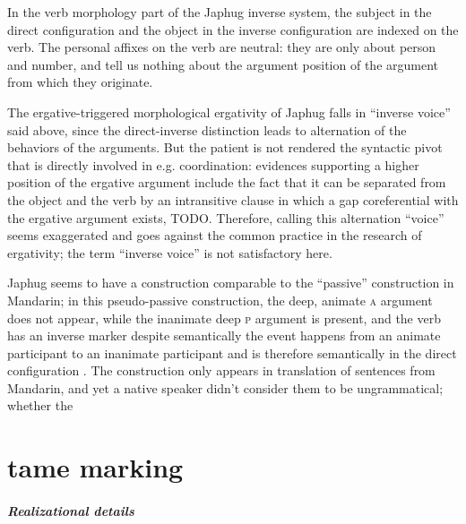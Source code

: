 \documentclass[a4paper, oneside, 12pt]{report}
\newcommand*{\citepage}[1]{p.~{#1}}
\newcommand{\category}[1]{\textsc{#1}}
\begin{document}
In the verb morphology part of the Japhug inverse system, 
the subject in the direct configuration
and the object in the inverse configuration 
are indexed on the verb. 
The personal affixes on the verb are neutral: 
they are only about person and number, 
and tell us nothing about the argument position of the argument 
from which they originate.

The ergative-triggered morphological ergativity of Japhug
falls in ``inverse voice'' said above, 
since the direct-inverse distinction leads to 
alternation of the behaviors of the arguments.
But the patient is not rendered the syntactic pivot 
that is directly involved in e.g. coordination:
evidences supporting a higher position of the ergative argument 
include the fact that it can be separated from the object and the verb 
by an intransitive clause \citep[\citepage{306}]{jacques2021grammar}
in which a gap coreferential with the ergative argument exists, TODO.
Therefore, calling this alternation ``voice'' seems exaggerated 
and goes against the common practice in the research of ergativity;
the term ``inverse voice'' is not satisfactory here.

Japhug seems to have a construction comparable to
the ``passive'' construction in Mandarin;
in this pseudo-passive construction,
the deep, animate \category{a} argument does not appear, 
while the inanimate deep \category{p} argument is present, 
and the verb has an inverse marker 
despite semantically the event happens 
from an animate participant to an inanimate participant
and is therefore semantically in the direct configuration
\citep[\citepage{575}]{jacques2021grammar}.
The construction only appears in translation of sentences from Mandarin,
and yet a native speaker didn't consider them to be ungrammatical;
whether the 

\chapter{\acs{tame} marking}


\paragraph*{Realizational details}
\end{document}
